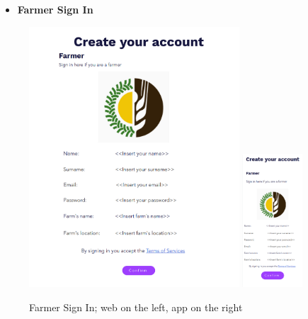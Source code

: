 \documentclass{article}
\begin{document}
    \begin{itemize}
        \item \textbf{Farmer Sign In}
    \end{itemize}
        \begin{figure} [h]
            \centering
            \includegraphics[width=0.7\textwidth]{images/UserInterfaces/Farmer/FarmerSignInWeb.png}
            \quad
            \includegraphics[width=0.2\textwidth]{images/UserInterfaces/Farmer/FarmerSignInApp.png}
            \quad
            \caption{\label{fig:farmerSignIn}Farmer Sign In; web on the left, app on the right}
        \end{figure}
    
    \newpage
    
\end{document}

